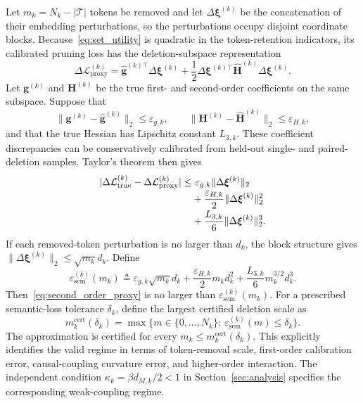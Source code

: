 \documentclass[journal]{IEEEtran}
\begin{document}
Let $m_k=N_k-|\mathcal T|$ tokens be removed and let $\Delta\bm\xi^{(k)}$ be the concatenation of their embedding perturbations, so the perturbations occupy disjoint coordinate blocks. Because~\eqref{eq:set_utility} is quadratic in the token-retention indicators, its calibrated pruning loss has the deletion-subspace representation
\begin{equation}
\Delta\mathcal L_{\mathrm{proxy}}^{(k)}
=\widehat{\bm g}^{(k)\top}\Delta\bm\xi^{(k)}
+\frac12\Delta\bm\xi^{(k)\top}
\widehat{\bm H}^{(k)}\Delta\bm\xi^{(k)}.
\label{eq:proxy_quadratic_form}
\end{equation}
Let $\bm g^{(k)}$ and $\bm H^{(k)}$ be the true first- and second-order coefficients on the same subspace. Suppose that
\begin{equation}
\|\bm g^{(k)}-\widehat{\bm g}^{(k)}\|_2\leq\varepsilon_{g,k},
\qquad
\|\bm H^{(k)}-\widehat{\bm H}^{(k)}\|_2\leq\varepsilon_{H,k},
\label{eq:proxy_coefficient_mismatch}
\end{equation}
and that the true Hessian has Lipschitz constant $L_{3,k}$. These coefficient discrepancies can be conservatively calibrated from held-out single- and paired-deletion samples. Taylor's theorem then gives
\begin{align}
|\Delta\mathcal L_{\mathrm{true}}^{(k)}
-\Delta\mathcal L_{\mathrm{proxy}}^{(k)}|
\leq&~\varepsilon_{g,k}\|\Delta\bm\xi^{(k)}\|_2
\notag\\[-0.2em]
&+\frac{\varepsilon_{H,k}}{2}\|\Delta\bm\xi^{(k)}\|_2^2
\notag\\[-0.2em]
&+\frac{L_{3,k}}{6}\|\Delta\bm\xi^{(k)}\|_2^3.
\label{eq:second_order_proxy}
\end{align}
If each removed-token perturbation is no larger than $d_k$, the block structure gives $\|\Delta\bm\xi^{(k)}\|_2\leq\sqrt{m_k}d_k$. Define
\begin{equation}
\varepsilon_{\mathrm{sem}}^{(k)}(m_k)
\triangleq \varepsilon_{g,k}\sqrt{m_k}d_k
+\frac{\varepsilon_{H,k}}{2}m_kd_k^2
+\frac{L_{3,k}}{6}m_k^{3/2}d_k^3.
\label{eq:semantic_proxy_bound}
\end{equation}
Then~\eqref{eq:second_order_proxy} is no larger than $\varepsilon_{\mathrm{sem}}^{(k)}(m_k)$. For a prescribed semantic-loss tolerance $\delta_k$, define the largest certified deletion scale as
\begin{equation}
m_{k}^{\mathrm{cert}}(\delta_k)
=\max\{m\in\{0,\ldots,N_k\}:~
\varepsilon_{\mathrm{sem}}^{(k)}(m)\leq\delta_k\}.
\label{eq:certified_deletion_scale}
\end{equation}
The approximation is certified for every $m_k\leq m_k^{\mathrm{cert}}(\delta_k)$. This explicitly identifies the valid regime in terms of token-removal scale, first-order calibration error, causal-coupling curvature error, and higher-order interaction. The independent condition $\kappa_k=\beta d_{M,k}/2<1$ in Section~\ref{sec:analysis} specifies the corresponding weak-coupling regime.
\end{document}
